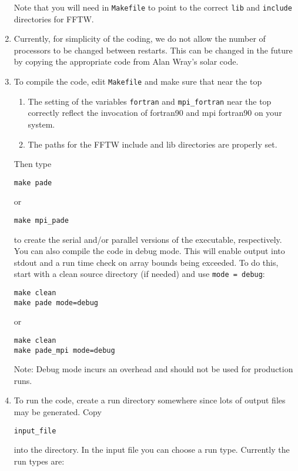 \documentclass[11pt]{amsart}
\begin{document}
\begin{enumerate}
Note that you will need in {\tt Makefile} to point to the correct {\tt lib} and {\tt include} directories for FFTW.

\item Currently, for simplicity of the coding, we do not allow the number of processors to
be changed between restarts.  This can be changed in the future by copying the appropriate
code from Alan Wray's solar code.

\item To compile the code, edit {\tt Makefile} and make sure
that near the top
\begin{enumerate}
\item The setting of the variables {\tt fortran} and {\tt mpi\_fortran} near
the top correctly reflect the invocation of fortran90 and mpi fortran90 
on your system.  
\item The paths for the FFTW include and lib directories are properly set.
\end{enumerate}

Then type

\begin{verbatim}
make pade
\end{verbatim}

or

\begin{verbatim}
make mpi_pade
\end{verbatim}
%
to create the serial and/or parallel versions of the executable, respectively.
You can also compile the code in debug mode.  This will enable output into
stdout and a run time check on array bounds being exceeded.  To do this, start
with a clean source directory (if needed) and use {\tt mode = debug}:

\begin{verbatim}
make clean
make pade mode=debug
\end{verbatim}

or

\begin{verbatim}
make clean
make pade_mpi mode=debug
\end{verbatim}

Note: Debug mode incurs an overhead and should not be used for production
runs.

\item To run the code, create a run directory somewhere since lots of
output files may be generated.  Copy \begin{verbatim}input_file\end{verbatim} into the directory.  
In the input file you can choose a run type.  Currently the run types
are:


\end{enumerate}
\end{document}
